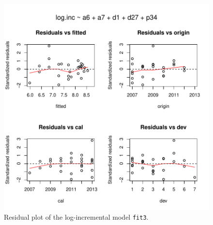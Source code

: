 \documentclass{article}
\begin{document}
\begin{figure}[thb]
\begin{center}
\includegraphics{Log-incremental-031}
\caption{Residual plot of the log-incremental model \texttt{fit3}.}\label{fig:fit3plot}
\end{center}
\end{figure}
\end{document}
